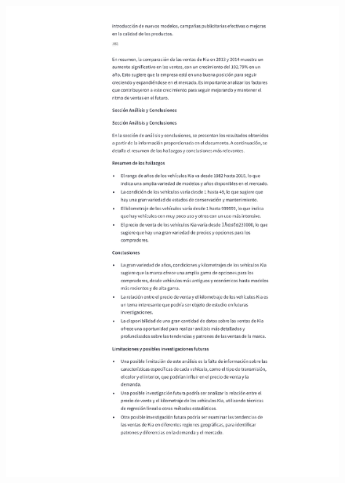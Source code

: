 \begin{anexos}
\begin{figure}
		\includegraphics[height=\textheight]{reporte/5.png}
	\end{figure}
	\begin{figure}
		\centering

\end{figure}
\end{anexos}
